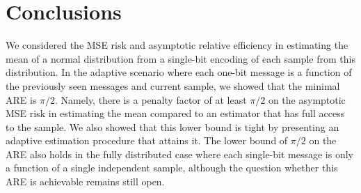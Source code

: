 \documentclass[letterpaper, conference,9pt]{IEEEtran}      %
\begin{document}
\section{Conclusions \label{sec:conclusions}}
We considered the MSE risk and asymptotic relative efficiency in estimating the mean of a normal distribution from a single-bit encoding of each sample from this distribution. In the adaptive scenario where each one-bit message is a function of the previously seen messages and current sample, we showed that the minimal ARE is $\pi/2$. Namely, there is a penalty factor of at least $\pi/2$ on the asymptotic MSE risk in estimating the mean compared to an estimator that has full access to the sample. We also showed that this lower bound is tight by presenting an adaptive estimation procedure that attains it. The lower bound of $\pi/2$ on the ARE also holds in the fully distributed case where each single-bit message is only a function of a single independent sample, although the question whether this ARE is achievable remains still open. 




\appendix
\end{document}
